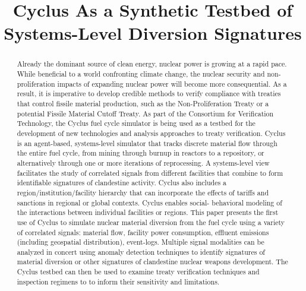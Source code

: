 \documentclass[12pt]{paper}
\begin{document}
\title{Cyclus As a Synthetic Testbed of Systems-Level Diversion Signatures}


\date{}


\maketitle



\begin{abstract}

  Already the dominant source of clean energy, nuclear power is growing at a
  rapid pace.  While beneficial to a world confronting climate change, the
  nuclear security and non-proliferation impacts of expanding nuclear power
  will become more consequential.  As a result, it is imperative to develop
  credible methods to verify compliance with treaties that control fissile
  material production, such as the Non-Proliferation Treaty or a potential
  Fissile Material Cutoff Treaty. As part of the Consortium for Verification
  Technology, the Cyclus fuel cycle simulator is being used as a testbed for the
  development of new technologies and analysis approaches to treaty
  verification. Cyclus is an agent-based, systems-level simulator that tracks
  discrete material flow through the entire fuel cycle, from mining through
  burnup in reactors to a repository, or alternatively through one or more
  iterations of reprocessing. A systems-level view facilitates the study of
  correlated signals from different facilities that combine to form identifiable
  signatures of clandestine activity. Cyclus also includes a
  region/institution/facility hierarchy that can incorporate the effects of
  tariffs and sanctions in regional or global contexts.  Cyclus enables social-
  behavioral modeling of the interactions between individual facilities or
  regions.  This paper presents the first use of Cyclus to simulate nuclear
  material diversion from the fuel cycle using a variety of correlated signals:
  material flow, facility power consumption, effluent emissions (including
  geospatial distribution), event-logs.  Multiple signal modalities can be
  analyzed in concert using anomaly detection techniques to identify signatures
  of material diversion or other signatures of clandestine nuclear weapons
  development.  The Cyclus testbed can then be used to examine treaty
  verification techniques and inspection regimens to to inform their sensitivity
  and limitations.

\end{abstract}









\begin{small}


\end{small}
\end{document}
